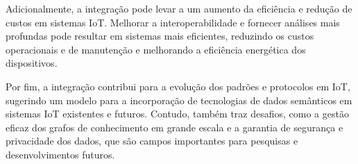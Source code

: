 Adicionalmente, a integração pode levar a um aumento da eficiência e redução de custos em sistemas IoT. Melhorar a interoperabilidade e fornecer análises mais profundas pode resultar em sistemas mais eficientes, reduzindo os custos operacionais e de manutenção e melhorando a eficiência energética dos dispositivos.

Por fim, a integração contribui para a evolução dos padrões e protocolos em IoT, sugerindo um modelo para a incorporação de tecnologias de dados semânticos em sistemas IoT existentes e futuros. Contudo, também traz desafios, como a gestão eficaz dos grafos de conhecimento em grande escala e a garantia de segurança e privacidade dos dados, que são campos importantes para pesquisas e desenvolvimentos futuros.
